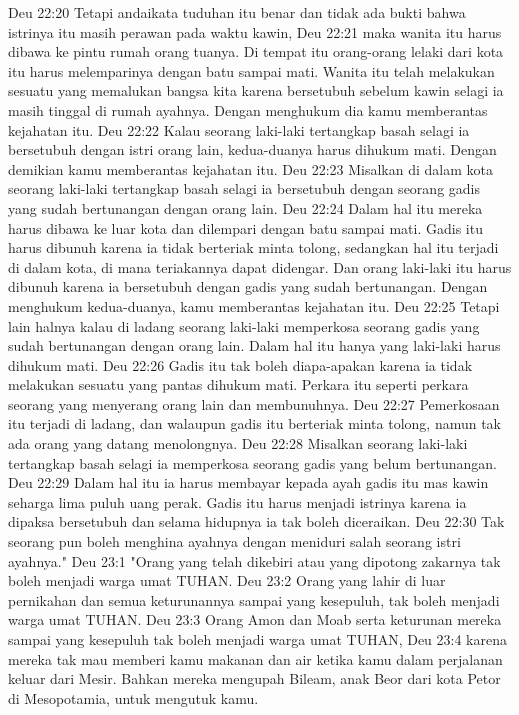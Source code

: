 Deu 22:20  Tetapi andaikata tuduhan itu benar dan tidak ada bukti bahwa istrinya itu masih perawan pada waktu kawin,
Deu 22:21  maka wanita itu harus dibawa ke pintu rumah orang tuanya. Di tempat itu orang-orang lelaki dari kota itu harus melemparinya dengan batu sampai mati. Wanita itu telah melakukan sesuatu yang memalukan bangsa kita karena bersetubuh sebelum kawin selagi ia masih tinggal di rumah ayahnya. Dengan menghukum dia kamu memberantas kejahatan itu.
Deu 22:22  Kalau seorang laki-laki tertangkap basah selagi ia bersetubuh dengan istri orang lain, kedua-duanya harus dihukum mati. Dengan demikian kamu memberantas kejahatan itu.
Deu 22:23  Misalkan di dalam kota seorang laki-laki tertangkap basah selagi ia bersetubuh dengan seorang gadis yang sudah bertunangan dengan orang lain.
Deu 22:24  Dalam hal itu mereka harus dibawa ke luar kota dan dilempari dengan batu sampai mati. Gadis itu harus dibunuh karena ia tidak berteriak minta tolong, sedangkan hal itu terjadi di dalam kota, di mana teriakannya dapat didengar. Dan orang laki-laki itu harus dibunuh karena ia bersetubuh dengan gadis yang sudah bertunangan. Dengan menghukum kedua-duanya, kamu memberantas kejahatan itu.
Deu 22:25  Tetapi lain halnya kalau di ladang seorang laki-laki memperkosa seorang gadis yang sudah bertunangan dengan orang lain. Dalam hal itu hanya yang laki-laki harus dihukum mati.
Deu 22:26  Gadis itu tak boleh diapa-apakan karena ia tidak melakukan sesuatu yang pantas dihukum mati. Perkara itu seperti perkara seorang yang menyerang orang lain dan membunuhnya.
Deu 22:27  Pemerkosaan itu terjadi di ladang, dan walaupun gadis itu berteriak minta tolong, namun tak ada orang yang datang menolongnya.
Deu 22:28  Misalkan seorang laki-laki tertangkap basah selagi ia memperkosa seorang gadis yang belum bertunangan.
Deu 22:29  Dalam hal itu ia harus membayar kepada ayah gadis itu mas kawin seharga lima puluh uang perak. Gadis itu harus menjadi istrinya karena ia dipaksa bersetubuh dan selama hidupnya ia tak boleh diceraikan.
Deu 22:30  Tak seorang pun boleh menghina ayahnya dengan meniduri salah seorang istri ayahnya."
Deu 23:1  "Orang yang telah dikebiri atau yang dipotong zakarnya tak boleh menjadi warga umat TUHAN.
Deu 23:2  Orang yang lahir di luar pernikahan dan semua keturunannya sampai yang kesepuluh, tak boleh menjadi warga umat TUHAN.
Deu 23:3  Orang Amon dan Moab serta keturunan mereka sampai yang kesepuluh tak boleh menjadi warga umat TUHAN,
Deu 23:4  karena mereka tak mau memberi kamu makanan dan air ketika kamu dalam perjalanan keluar dari Mesir. Bahkan mereka mengupah Bileam, anak Beor dari kota Petor di Mesopotamia, untuk mengutuk kamu.
